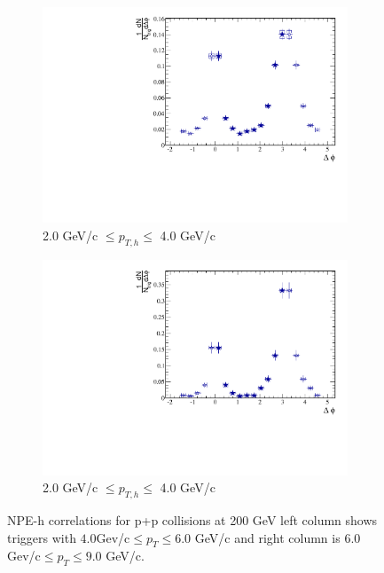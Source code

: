 \begin{figure}[htbp]
\begin{subfigure}{0.5\textwidth}
		\includegraphics[width=\textwidth]{Plots/Correlations/pp/pp_NPE_h_corr_primpt_4_5_assopt_3_4.pdf}
		\caption{2.0 GeV/c $\leq p_{T,h} \leq$ 4.0 GeV/c}
		\label{fig:ppcorre}
	\end{subfigure}	
	\begin{subfigure}{0.5\textwidth}
		\includegraphics[width=\textwidth]{Plots/Correlations/pp/pp_NPE_h_corr_primpt_6_8_assopt_3_4.pdf}
		\caption{2.0 GeV/c $\leq p_{T,h} \leq$ 4.0 GeV/c}
		\label{fig:ppcorrf}
	\end{subfigure}	
\caption[NPE-hadron correlations in p+p]{NPE-h correlations for p+p collisions at 200 GeV left column shows triggers with $4.0 $Gev/c$\leq p_{T} \leq 6.0$ GeV/c and right column is $6.0 $Gev/c$\leq p_{T} \leq 9.0$ GeV/c.}
\label{fig:ppcorr}
\end{figure}


